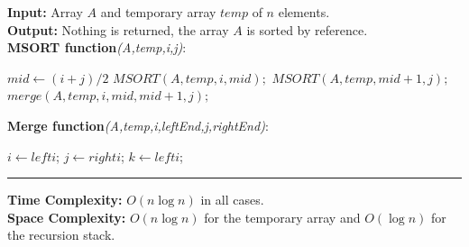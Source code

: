 \newpage

\begin{Func}
    \textbf{Input:} Array $A$ and temporary array $temp$ of $n$ elements.\\
    \textbf{Output:} Nothing is returned, the array $A$ is sorted by reference.\\

    \vspace{-.5em}
    \noindent
    \textbf{MSORT function}\textit{(A,temp,i,j)}:\\
    \begin{algorithm}[H]
        \label{algo:mergesort}
            $mid \gets (i + j) / 2$\;
            $MSORT(A, temp, i, mid);$ 
            $MSORT(A, temp, mid + 1, j);$ 
            $merge(A, temp, i, mid, mid + 1, j);$ 
        
    \end{algorithm}

    \vspace{.5em}

    \noindent
    \textbf{Merge function}\textit{(A,temp,i,leftEnd,j,rightEnd)}:\\
    \begin{algorithm}[H]
        $i \gets lefti$; 
        $j \gets righti$; 
        $k \gets lefti$; 
        
        
        
        
    \end{algorithm}

    \noindent\rule{\textwidth}{0.4pt}

    \noindent
    \textbf{Time Complexity:} $O(n \log n)$ in all cases.\\
    \textbf{Space Complexity:} $O(n \log n)$ for the temporary array and $O(\log n)$ for the recursion stack.
\end{Func}

